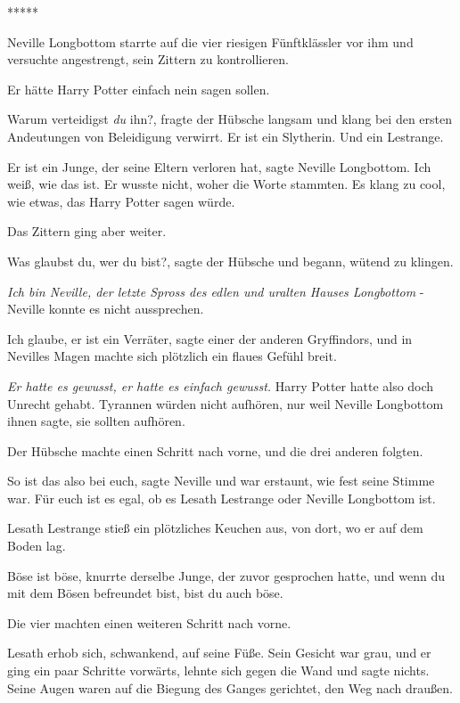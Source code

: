 \begin{center}*****\end{center}

Neville Longbottom starrte auf die vier riesigen Fünftklässler vor ihm und
versuchte angestrengt, sein Zittern zu kontrollieren.

Er hätte Harry Potter einfach nein sagen sollen.

\glqq{}Warum verteidigst \emph{du} ihn?\grqq{}, fragte der Hübsche langsam und
klang bei den ersten Andeutungen von Beleidigung verwirrt. \glqq{}Er ist ein
Slytherin. Und ein Lestrange.\grqq{}

\glqq{}Er ist ein Junge, der seine Eltern verloren hat\grqq{}, sagte Neville
Longbottom. \glqq{}Ich weiß, wie das ist.\grqq{} Er wusste nicht, woher die
Worte stammten. Es klang zu cool, wie etwas, das Harry Potter sagen würde.

Das Zittern ging aber weiter.

\glqq{}Was glaubst du, wer du bist?\grqq{}, sagte der Hübsche und begann, wütend
zu klingen.

\emph{Ich bin Neville, der letzte Spross des edlen und uralten Hauses
Longbottom} - Neville konnte es nicht aussprechen.

\glqq{}Ich glaube, er ist ein Verräter\grqq{}, sagte einer der anderen
Gryffindors, und in Nevilles Magen machte sich plötzlich ein flaues Gefühl
breit.

\emph{Er hatte es gewusst, er hatte es einfach gewusst.}
Harry Potter hatte also doch Unrecht gehabt. Tyrannen würden nicht aufhören, nur
weil Neville Longbottom ihnen sagte, sie sollten aufhören.

Der Hübsche machte einen Schritt nach vorne, und die drei anderen folgten.

\glqq{}So ist das also bei euch\grqq{}, sagte Neville und war erstaunt, wie fest
seine Stimme war. \glqq{}Für euch ist es egal, ob es Lesath Lestrange oder
Neville Longbottom ist.\grqq{}

Lesath Lestrange stieß ein plötzliches Keuchen aus, von dort, wo er auf dem
Boden lag.

\glqq{}Böse ist böse\grqq{}, knurrte derselbe Junge, der zuvor gesprochen hatte,
\glqq{}und wenn du mit dem Bösen befreundet bist, bist du auch böse.\grqq{}

Die vier machten einen weiteren Schritt nach vorne.

Lesath erhob sich, schwankend, auf seine Füße. Sein Gesicht war grau, und er
ging ein paar Schritte vorwärts, lehnte sich gegen die Wand und sagte nichts.
Seine Augen waren auf die Biegung des Ganges gerichtet, den Weg nach draußen.

